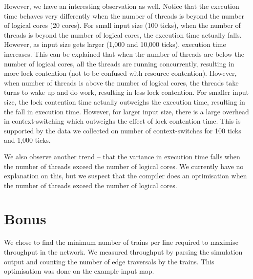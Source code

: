 \documentclass[a4paper,12pt]{article}
\begin{document}
However, we have an interesting observation as well. Notice that the execution time behaves very differently when the number of threads is beyond the number of logical cores (20 cores). For small input size (100 ticks), when the number of threads is beyond the number of logical cores, the execution time actually falls. However, as input size gets larger (1,000 and 10,000 ticks), execution time increases. This can be explained that when the number of threads are below the number of logical cores, all the threads are running concurrently, resulting in more lock contention (not to be confused with resource contention). However, when number of threads is above the number of logical cores, the threads take turns to wake up and do work, resulting in less lock contention. For smaller input size, the lock contention time actually outweighs the execution time, resulting in the fall in execution time. However, for larger input size, there is a large overhead in context-switching which outweighs the effect of lock contention time. This is supported by the data we collected on number of context-switches for 100 ticks and 1,000 ticks.

We also observe another trend -- that the variance in execution time falls when the number of threads exceed the number of logical cores. We currently have no explanation on this, but we suspect that the compiler does an optimisation when the number of threads exceed the number of logical cores.


\section{Bonus}

We chose to find the minimum number of trains per line required to maximise throughput in the network. We measured throughput by parsing the simulation output and counting the number of edge traversals by the trains. This optimisation was done on the example input map.
\end{document}
